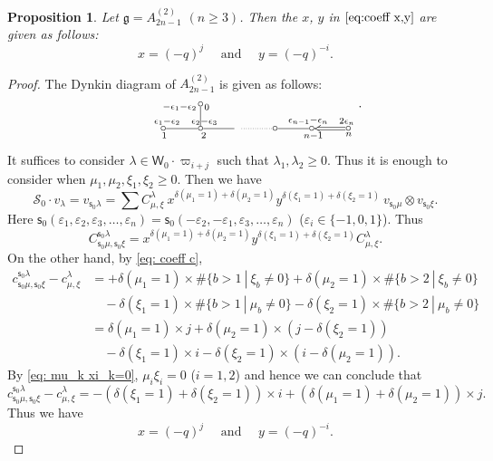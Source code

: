 \documentclass[11pt, leqno]{amsart}
\newtheorem{proposition}[theorem]{Proposition}
\theoremstyle{definition}
\numberwithin{equation}{section}
\begin{document}
\begin{proposition} Let ${\mathfrak g}=A^{(2)}_{2n-1}$ $(n \ge 3)$. Then the $x$, $y$ in $\eqref{eq:coeff x,y}$ are given as follows:
$$x = (-q)^{j} \quad \text{ and } \quad y = (-q)^{-i}.$$
\end{proposition}
\begin{proof}
The Dynkin diagram of $A^{(2)}_{2n-1}$ is given as follows:
$$
\xymatrix@R=3ex{ & *{\circ}<3pt> \ar@{-}[d]_<{\qquad \qquad -\epsilon_1-\epsilon_2  }^<{0}\\
*{\circ}<3pt> \ar@{-}[r]_<{1 \ }^{\epsilon_1-\epsilon_2 \qquad \ }
&*{\circ}<3pt> \ar@{-}[r]_<{2}^{\epsilon_2-\epsilon_3 \qquad \ }  &
{} \ar@{.}[r] & *{\circ}<3pt> \ar@{-}[r]_>{\,\,\,\ n-1}^{ \qquad \
\epsilon_{n-1}-\epsilon_{n} }
&*{\circ}<3pt>\ar@{<=}[r]_>{\,\,\,\,n}^{ \qquad \ \  2\epsilon_n }
&*{\circ }<3pt> }.$$
It suffices to consider $\lambda \in \mathsf{W}_0 \cdot {\varpi}_{i+j}$ such that
 $\lambda_1,\lambda_2 \ge 0$. Thus it is enough to consider when $\mu_1,\mu_2,\xi_1,\xi_2 \ge 0$. Then we have
$$ \mathcal{S}_0 \cdot v_\lambda=v_{{\mathsf{s}}_0 \lambda} = \sum C^{\lambda}_{\mu,\xi} \
x^{\delta(\mu_1=1)+\delta(\mu_2=1)}y^{\delta(\xi_1=1)+\delta(\xi_2=1)}
\ v_{{\mathsf{s}}_0 \mu} \otimes v_{{\mathsf{s}}_0 \xi}.$$
Here
${\mathsf{s}}_0(\varepsilon_1,\varepsilon_2,\varepsilon_3,\ldots,\varepsilon_n)=
{\mathsf{s}}_0(-\varepsilon_2,-\varepsilon_1,\varepsilon_3,\ldots,\varepsilon_n)$ ($\varepsilon_i \in \{ -1,0,1\}$).
Thus
$$ C^{{\mathsf{s}}_0\lambda}_{{\mathsf{s}}_0\mu,{\mathsf{s}}_0\xi} = x^{\delta(\mu_1=1)+\delta(\mu_2=1)}y^{\delta(\xi_1=1)+\delta(\xi_2=1)} C^{\lambda}_{\mu,\xi}.$$
On the other hand, by \eqref{eq: coeff c},
\begin{align*}
c^{{\mathsf{s}}_0\lambda}_{{\mathsf{s}}_0\mu,{\mathsf{s}}_0\xi}-c^{\lambda}_{\mu,\xi}   &=
+\delta(\mu_1=1) \times \# \{ b>1 \ | \
\xi_b \ne 0 \} + \delta(\mu_2=1) \times  \# \{ b>2 \ | \ \xi_b \ne 0 \} \\
 & \quad - \delta(\xi_1=1) \times  \# \{ b>1 \ | \ \mu_b \ne 0 \}  - \delta(\xi_2=1)\times \# \{ b>2 \ | \ \mu_b \ne 0
 \} \\
 &= \delta(\mu_1=1) \times j + \delta(\mu_2=1) \times
 (j-\delta(\xi_2=1)) \\ & \quad - \delta(\xi_1=1) \times i -\delta(\xi_2=1) \times
 (i-\delta(\mu_2=1)).
\end{align*}
By \eqref{eq: mu_k xi_k=0}, $\mu_i\xi_i=0$ ($i=1,2$) and hence we can conclude that
$$ c^{{\mathsf{s}}_0\lambda}_{{\mathsf{s}}_0\mu,{\mathsf{s}}_0\xi} -c^{\lambda}_{\mu,\xi} =
-(\delta(\xi_1=1)+\delta(\xi_2=1))\times
i+(\delta(\mu_1=1)+\delta(\mu_2=1))\times j.$$ Thus we have
$$x = (-q)^{j} \quad \text{ and } \quad y = (-q)^{-i}.$$
\end{proof}
\end{document}
